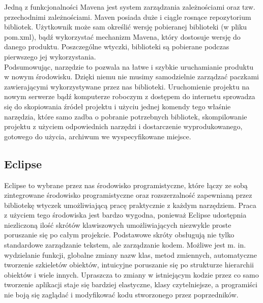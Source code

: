 \documentclass[licencjacka]{pracamgr}
\begin{document}
Jedną z funkcjonalności Mavena jest system zarządzania zależnościami oraz tzw. przechodnimi zależnościami.
Maven posiada duże i ciągle rosnące repozytorium bibliotek. Użytkownik może sam określić wersję pobieranej biblioteki (w pliku pom.xml), bądź wykorzystać mechanizm Mavena, 
który dostosuje wersję do danego produktu. Poszczególne wtyczki, biblioteki są pobierane podczas pierwszego jej wykorzystania.  \\

Podsumowując, narzędzie to pozwala na łatwe i szybkie uruchamianie produktu w nowym środowisku. Dzięki niemu nie musimy samodzielnie zarządzać paczkami zawierającymi wykorzystywane przez nas biblioteki. Uruchomienie projektu na nowym serwerze bądź komputerze roboczym z dostępem do internetu sprowadza się do skopiowania źródeł projektu i użyciu jednej komendy tego właśnie narzędzia, które samo zadba o pobranie potrzebnych bibliotek, skompilowanie projektu z użyciem odpowiednich narzędzi i dostarczenie wyprodukowanego, gotowego do użycia, archiwum we wyspecyfikowane miejsce.
\subsection{Eclipse}

Eclipse to wybrane przez nas środowisko programistyczne, które łączy ze sobą zintegrowane środowisko programistyczne oraz rozszerzalność zapewnianą przez bibliotekę wtyczek umożliwiającą pracę praktycznie z każdym narzędziem. Praca z użyciem tego środowiska jest bardzo wygodna, ponieważ Eclipse udostępnia niezliczoną ilość skrótów klawiszowych umożliwiających niezwykle proste poruszanie się po całym projekcie. Podstawowe skróty obsługują nie tylko standardowe zarządzanie tekstem, ale zarządzanie kodem. Możliwe jest m. in. wydzielanie funkcji, globalne zmiany nazw klas, metod zmiennych, automatyczne tworzenie szkieletów obiektów, intuicyjne poruszanie się po strukturze hierarchii obiektów i wiele innych. Upraszcza to zmiany w istniejącym kodzie przez co samo tworzenie aplikacji staje się bardziej elastyczne, klasy czytelniejsze, a programiści nie boją się zaglądać i modyfikować kodu stworzonego przez poprzedników.
\end{document}
